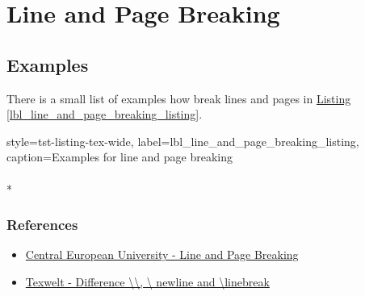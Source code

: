\section{Line and Page Breaking}
\subsection{Examples}
There is a small list of examples how break lines and pages in
\hyperref[line_and_page_breaking_listing]{Listing}
\ref{lbl_line_and_page_breaking_listing}.
\begin{sscodeenv_wide}{%
    style=tst-listing-tex-wide,%
    label=lbl_line_and_page_breaking_listing,%
    caption=Examples for line and page breaking}
    \\

    \\*

    \cleardoublepage

    \clearpage

    \newline
\end{sscodeenv_wide}
\subsubsection{References}
\begin{itemize}
    \item{\href{http://www.personal.ceu.hu/tex/breaking.htm}
        {Central European University - Line and Page Breaking} \autocite{CEU01}}
    \item{\href{https://texwelt.de/wissen/fragen/4014/was-ist-der-unterschied-zwischen-newline-und-linebreak}
        {Texwelt - Difference \textbackslash \textbackslash, \textbackslash
        newline and \textbackslash linebreak} \autocite{TEXWELT14}}
\end{itemize}
